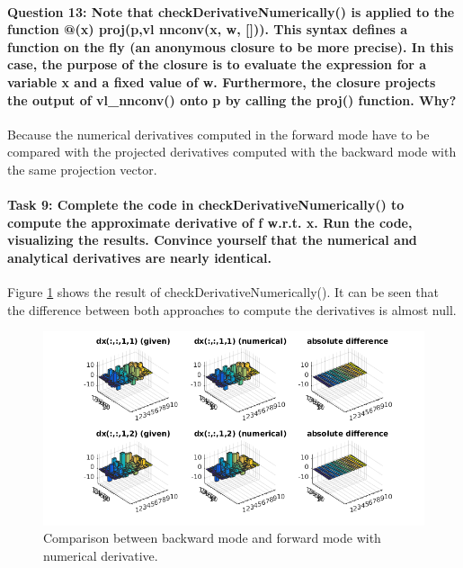 \documentclass[12pt]{article}
\begin{document}
\paragraph{Question 13: Note that checkDerivativeNumerically() is applied to the function @(x) proj(p,vl nnconv(x, w, [])). This syntax defines a function on the fly (an anonymous closure to be more precise). In this case, the purpose of the closure is to evaluate the expression for a variable x and a fixed value of w. Furthermore, the closure projects the output of vl\_nnconv() onto p by calling the proj() function. Why?} Because the numerical derivatives computed in the forward mode have to be compared with the projected derivatives computed with the backward mode with the same projection vector.
\paragraph{Task 9: Complete the code in checkDerivativeNumerically() to compute the approximate derivative of f w.r.t. x. Run the code, visualizing the results. Convince yourself that the numerical and analytical derivatives are nearly identical.} Figure \ref{fig:21a} shows the result of checkDerivativeNumerically(). It can be seen that the difference between both approaches to compute the derivatives is almost null.
\begin{figure}[htbp]
 \centering
 \includegraphics[width=\textwidth]{21a}
 \caption{Comparison between backward mode and forward mode with numerical derivative.}
 \label{fig:21a}
\end{figure}
\end{document}
